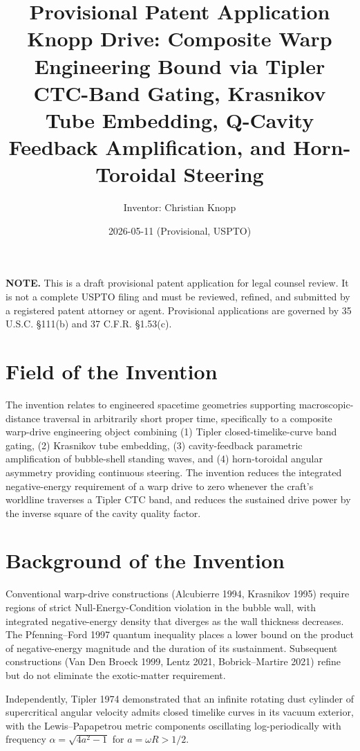 \documentclass[11pt,a4paper]{article}
\title{\bfseries Provisional Patent Application \\
\large Knopp Drive: Composite Warp Engineering Bound via Tipler CTC-Band Gating, Krasnikov Tube Embedding, Q-Cavity Feedback Amplification, and Horn-Toroidal Steering}
\author{Inventor: Christian Knopp}
\date{2026-05-11 (Provisional, USPTO)}
\begin{document}
\maketitle

\noindent\textbf{NOTE.} This is a draft provisional patent application for legal counsel review. It is not a complete USPTO filing and must be reviewed, refined, and submitted by a registered patent attorney or agent. Provisional applications are governed by 35 U.S.C. \S 111(b) and 37 C.F.R. \S 1.53(c).

\section{Field of the Invention}

The invention relates to engineered spacetime geometries supporting macroscopic-distance traversal in arbitrarily short proper time, specifically to a composite warp-drive engineering object combining (1) Tipler closed-timelike-curve band gating, (2) Krasnikov tube embedding, (3) cavity-feedback parametric amplification of bubble-shell standing waves, and (4) horn-toroidal angular asymmetry providing continuous steering. The invention reduces the integrated negative-energy requirement of a warp drive to zero whenever the craft's worldline traverses a Tipler CTC band, and reduces the sustained drive power by the inverse square of the cavity quality factor.

\section{Background of the Invention}

Conventional warp-drive constructions (Alcubierre 1994, Krasnikov 1995) require regions of strict Null-Energy-Condition violation in the bubble wall, with integrated negative-energy density that diverges as the wall thickness decreases. The Pfenning--Ford 1997 quantum inequality places a lower bound on the product of negative-energy magnitude and the duration of its sustainment. Subsequent constructions (Van Den Broeck 1999, Lentz 2021, Bobrick--Martire 2021) refine but do not eliminate the exotic-matter requirement.

Independently, Tipler 1974 demonstrated that an infinite rotating dust cylinder of supercritical angular velocity admits closed timelike curves in its vacuum exterior, with the Lewis--Papapetrou metric components oscillating log-periodically with frequency $\alpha = \sqrt{4 a^2 - 1}$ for $a = \omega R > 1/2$.
\end{document}
